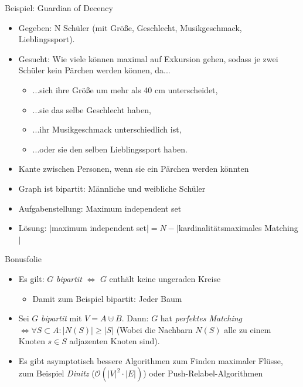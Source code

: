 \documentclass[18pt]{beamer}
\begin{document}
\begin{frame}{Beispiel: Guardian of Decency}
\begin{itemize}
\item Gegeben: N Sch\"uler (mit Gr\"o{\ss}e, Geschlecht, Musikgeschmack, Lieblingssport).
\item Gesucht: Wie viele k\"onnen maximal auf Exkursion gehen, sodass je zwei Sch\"uler kein P\"archen werden k\"onnen, da...
\begin{itemize}
	\item ...sich ihre Gr\"o{\ss}e um mehr als 40 cm unterscheidet,
	\item ...sie das selbe Geschlecht haben,
	\item ...ihr Musikgeschmack unterschiedlich ist,
	\item ...oder sie den selben Lieblingssport haben.
\end{itemize}

\pause

\item Kante zwischen Personen, wenn sie ein P\"archen werden k\"onnten
\item Graph ist bipartit: M\"annliche und weibliche Sch\"uler
\pause
\item Aufgabenstellung: Maximum independent set
\item L\"osung: $|$maximum independent set$| = N - |$kardinalit\"atsmaximales Matching$|$
\end{itemize}
\end{frame}

\begin{frame}{Bonusfolie}
\begin{itemize}
\item Es gilt: $G$ \textit{bipartit} $\Leftrightarrow$ $G$ enth\"alt keine ungeraden Kreise
\begin{itemize}
	\item Damit zum Beispiel bipartit: Jeder Baum
\end{itemize}
\item Sei $G$ \textit{bipartit} mit $V = A \cupdot B$. Dann: $G$ hat \textit{perfektes Matching} $\Leftrightarrow \forall S \subset A: |N(S)| \geq |S|$
(Wobei die Nachbarn $N(S)$ alle zu einem Knoten $s \in S$ adjazenten Knoten sind).
\item Es gibt asymptotisch bessere Algorithmen zum Finden maximaler Fl\"usse, zum Beispiel \textit{Dinitz} ($\mathcal{O}(|V|^{2} \cdot |E|)$) oder Push-Relabel-Algorithmen
\end{itemize}
\end{frame}
\end{document}
